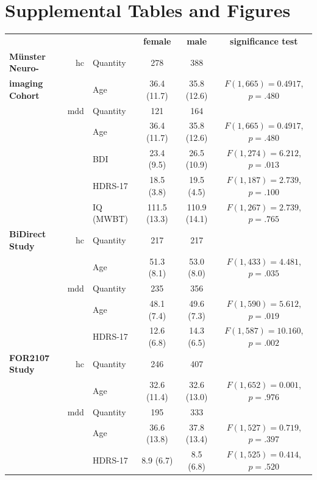 \documentclass{article}
\begin{document}
    \section{Supplemental Tables and Figures}
    \begin{table}[ht]
        \renewcommand{\arraystretch}{1.5}
        \begin{center}
            \begin{tabular}{lr|lccc}
                \multicolumn{3}{c}{} & {\textbf{female}} & {\textbf{male}} & {\textbf{significance test}} \\ \cline{2-6}
                \textbf{Münster Neuro-} & \acs{hc} & Quantity & 278 & 388 &  \\
                \textbf{imaging Cohort} & & Age & 36.4 (11.7) & 35.8 (12.6) & $F(1,665)=0.4917$, $p=.480$\\ \cline{3-6}
                & \acs{mdd} & Quantity &121 & 164 \\
                & & Age & 36.4 (11.7) & 35.8 (12.6) & $F(1,665)=0.4917$, $p=.480$\\
                & & BDI & 23.4 (9.5) & 26.5 (10.9) & $F(1,274)=6.212$, $p=.013$\\
                & & HDRS-17 & 18.5 (3.8) & 19.5 (4.5) & $F(1,187)=2.739$, $p=.100$\\
                & & IQ (MWBT) & 111.5 (13.3) & 110.9 (14.1) & $F(1,267)=2.739$, $p=.765$\\  \cline{2-6}
                \textbf{BiDirect Study} & \acs{hc} & Quantity & 217 & 217 \\
                & & Age & 51.3 (8.1) & 53.0 (8.0) & $F(1,433)=4.481$, $p=.035$ \\ \cline{3-6}
                & \acs{mdd} & Quantity & 235 & 356 \\
                & & Age & 48.1 (7.4) & 49.6 (7.3) & $F(1,590)=5.612$,  $p=.019$ \\
                & & HDRS-17 & 12.6 (6.8) & 14.3 (6.5) & $F(1,587)=10.160$, $p=.002$ \\ \cline{2-6}
                \textbf{FOR2107 Study} & \acs{hc} & Quantity & 246 & 407 \\
                & & Age & 32.6 (11.4) & 32.6 (13.0) & $F(1,652)=0.001$, $p=.976$ \\ \cline{3-6}
                & \acs{mdd} & Quantity & 195 & 333 \\
                & & Age & 36.6 (13.8) & 37.8 (13.4) & $F(1,527)=0.719$, $p=.397$  \\
                & & HDRS-17 & 8.9 (6.7) & 8.5 (6.8) & $F(1,525)=0.414$, $p=.520$  \\

\end{tabular}
\end{center}
\end{table}
\end{document}
